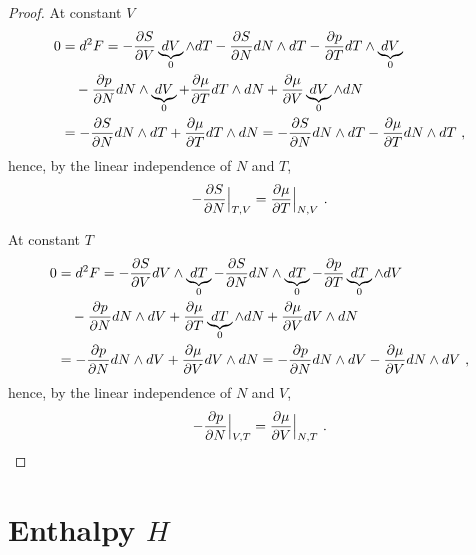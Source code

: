 \begin{proof}
        At constant $V$ 
        \begin{equation*}
        \begin{aligned}
            0 & = d^2 F = - \frac{\partial S}{\partial V} \underbrace{dV}_0 \wedge dT - \frac{\partial S}{\partial N} dN \wedge dT - \frac{\partial p}{\partial T} dT \wedge \underbrace{dV}_0 \\ & \quad - \frac{\partial p}{\partial N} dN \wedge \underbrace{dV}_0 + \frac{\partial\mu}{\partial T} dT \wedge dN + \frac{\partial\mu}{\partial V} \underbrace{dV}_0 \wedge dN \\ & = - \frac{\partial S}{\partial N} dN \wedge dT + \frac{\partial\mu}{\partial T} dT \wedge dN = - \frac{\partial S}{\partial N} dN \wedge dT - \frac{\partial\mu}{\partial T} dN \wedge dT~,
        \end{aligned}
        \end{equation*}
        hence, by the linear independence of $N$ and $T$,
        \begin{equation*}
            - \frac{\partial S}{\partial N} \Big \vert_{T,V} = \frac{\partial\mu}{\partial T} \Big \vert_{N, V} ~.
        \end{equation*}

        At constant $T$ 
        \begin{equation*}
        \begin{aligned}
            0 & = d^2 F = - \frac{\partial S}{\partial V} dV \wedge \underbrace{dT}_0 - \frac{\partial S}{\partial N} dN \wedge \underbrace{dT}_0 - \frac{\partial p}{\partial T} \underbrace{dT}_0 \wedge dV \\ & \quad - \frac{\partial p}{\partial N} dN \wedge dV + \frac{\partial\mu}{\partial T} \underbrace{dT}_0 \wedge dN + \frac{\partial\mu}{\partial V} dV \wedge dN \\ & = - \frac{\partial p}{\partial N} dN \wedge dV + \frac{\partial\mu}{\partial V} dV \wedge dN =- \frac{\partial p}{\partial N} dN \wedge dV - \frac{\partial\mu}{\partial V} dN \wedge dV ~,
        \end{aligned}
        \end{equation*}
        hence, by the linear independence of $N$ and $V$,
        \begin{equation*}
            - \frac{\partial p}{\partial N} \Big \vert_{V,T} = \frac{\partial\mu}{\partial V} \Big \vert_{N, T} ~.
        \end{equation*}
    \end{proof}

\section{Enthalpy $H$} 

